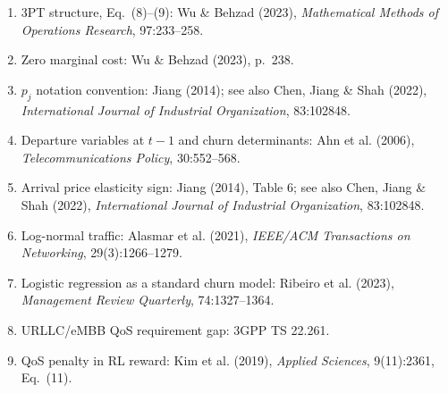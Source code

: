 \documentclass[11pt]{article}
\begin{document}
\begin{enumerate}[label=Ref\arabic*.,leftmargin=2.2em]
    \item 3PT structure, Eq.~(8)--(9): Wu \& Behzad (2023), \emph{Mathematical Methods of Operations Research}, 97:233--258.
    \item Zero marginal cost: Wu \& Behzad (2023), p.~238.
    \item $p_j$ notation convention: Jiang (2014); see also Chen, Jiang \& Shah (2022), \emph{International Journal of Industrial Organization}, 83:102848.
    \item Departure variables at $t-1$ and churn determinants: Ahn et al. (2006), \emph{Telecommunications Policy}, 30:552--568.
    \item Arrival price elasticity sign: Jiang (2014), Table 6; see also Chen, Jiang \& Shah (2022), \emph{International Journal of Industrial Organization}, 83:102848.
    \item Log-normal traffic: Alasmar et al. (2021), \emph{IEEE/ACM Transactions on Networking}, 29(3):1266--1279.
    \item Logistic regression as a standard churn model: Ribeiro et al. (2023), \emph{Management Review Quarterly}, 74:1327--1364.
    \item URLLC/eMBB QoS requirement gap: 3GPP TS 22.261.
    \item QoS penalty in RL reward: Kim et al. (2019), \emph{Applied Sciences}, 9(11):2361, Eq.~(11).
\end{enumerate}
\end{document}
